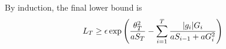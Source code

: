By induction, the final lower bound is 
\[
L_{T} \geq \epsilon \exp\left(\frac{\theta_{T}^2}{a S_{T}} - \sum_{i=1}^{T} \frac{|g_i| G_i}{a S_{i-1} + a G^2_i} \right) \\
\]


% 
% 
% 
% 
